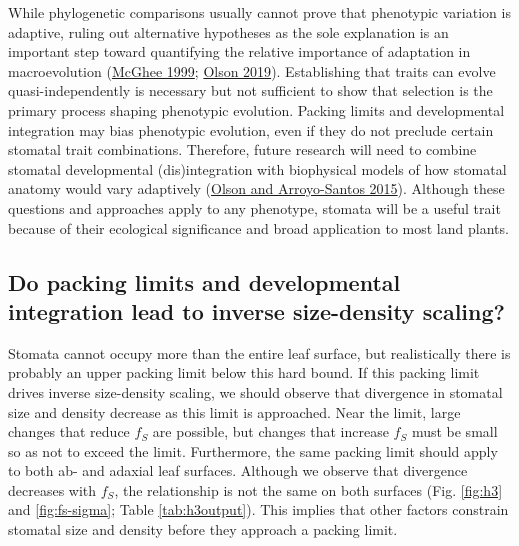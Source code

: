 \documentclass[
  12pt,
]{article}
\begin{document}
While phylogenetic comparisons usually cannot prove that phenotypic variation is adaptive, ruling out alternative hypotheses as the sole explanation is an important step toward quantifying the relative importance of adaptation in macroevolution (\protect\hyperlink{ref-mcghee_theoretical_1999}{McGhee 1999}; \protect\hyperlink{ref-olson_plant_2019}{Olson 2019}). Establishing that traits can evolve quasi-independently is necessary but not sufficient to show that selection is the primary process shaping phenotypic evolution. Packing limits and developmental integration may bias phenotypic evolution, even if they do not preclude certain stomatal trait combinations. Therefore, future research will need to combine stomatal developmental (dis)integration with biophysical models of how stomatal anatomy would vary adaptively (\protect\hyperlink{ref-olson_how_2015}{Olson and Arroyo-Santos 2015}). Although these questions and approaches apply to any phenotype, stomata will be a useful trait because of their ecological significance and broad application to most land plants.

\hypertarget{do-packing-limits-and-developmental-integration-lead-to-inverse-size-density-scaling}{%
\subsection{Do packing limits and developmental integration lead to inverse size-density scaling?}\label{do-packing-limits-and-developmental-integration-lead-to-inverse-size-density-scaling}}

Stomata cannot occupy more than the entire leaf surface, but realistically there is probably an upper packing limit below this hard bound. If this packing limit drives inverse size-density scaling, we should observe that divergence in stomatal size and density decrease as this limit is approached. Near the limit, large changes that reduce \(f_S\) are possible, but changes that increase \(f_S\) must be small so as not to exceed the limit. Furthermore, the same packing limit should apply to both ab- and adaxial leaf surfaces. Although we observe that divergence decreases with \(f_S\), the relationship is not the same on both surfaces (Fig. \ref{fig:h3} and \ref{fig:fs-sigma}; Table \ref{tab:h3output}). This implies that other factors constrain stomatal size and density before they approach a packing limit.
\end{document}
